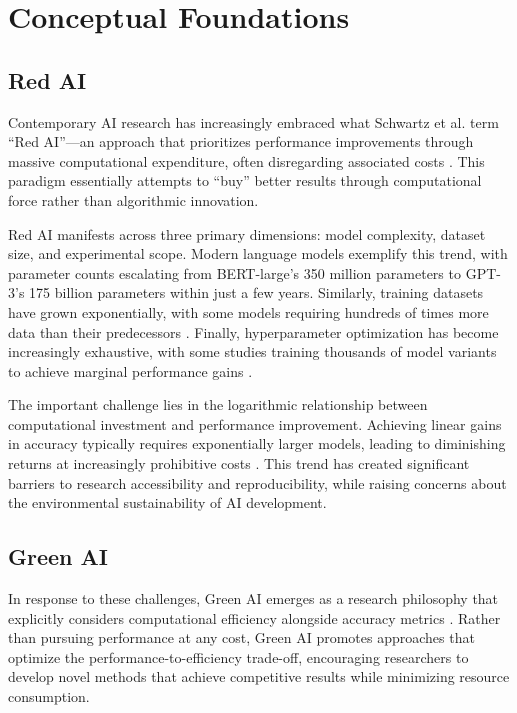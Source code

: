 \documentclass[twoside]{ai_ethics_class}
\begin{document}
\section{Conceptual Foundations}


\subsection{Red AI}

Contemporary AI research has increasingly embraced what Schwartz et al. term ``Red AI''—an approach that prioritizes performance improvements through massive computational expenditure, often disregarding associated costs \cite{schwartz2020green}.
This paradigm essentially attempts to ``buy'' better results through computational force rather than algorithmic innovation.

Red AI manifests across three primary dimensions: model complexity, dataset size, and experimental scope.
Modern language models exemplify this trend, with parameter counts escalating from BERT-large's 350 million parameters to GPT-3's 175 billion parameters within just a few years.
Similarly, training datasets have grown exponentially, with some models requiring hundreds of times more data than their predecessors \cite{bender2021dangers}.
Finally, hyperparameter optimization has become increasingly exhaustive, with some studies training thousands of model variants to achieve marginal performance gains \cite{schwartz2020green}.

The important challenge lies in the logarithmic relationship between computational investment and performance improvement.
Achieving linear gains in accuracy typically requires exponentially larger models, leading to diminishing returns at increasingly prohibitive costs \cite{schwartz2020green}.
This trend has created significant barriers to research accessibility and reproducibility, while raising concerns about the environmental sustainability of AI development.

\subsection{Green AI}

In response to these challenges, Green AI emerges as a research philosophy that explicitly considers computational efficiency alongside accuracy metrics \cite{schwartz2020green}.
Rather than pursuing performance at any cost, Green AI promotes approaches that optimize the performance-to-efficiency trade-off, encouraging researchers to develop novel methods that achieve competitive results while minimizing resource consumption.
\end{document}
